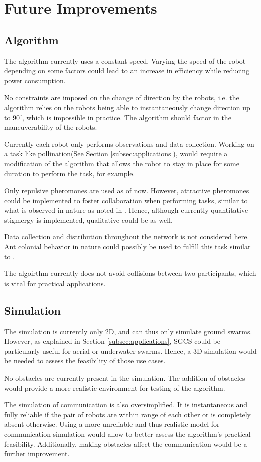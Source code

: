 \section{Future Improvements} 
\subsection{Algorithm}
The algorithm currently uses a constant speed. Varying the speed of the robot depending on some factors could lead to an increase in efficiency while reducing power consumption. 
\par No constraints are imposed on the change of direction by the robots, i.e. the algorithm relies on the robots being able to instantaneously change direction up to $90^{\circ}$, which is impossible in practice. The algorithm should factor in the maneuverability of the robots.
\par Currently each robot only performs observations and data-collection. Working on a task like pollination(See Section \ref{subsec:applications}), would require a modification of the algorithm that allows the robot to stay in place for some duration to perform the task, for example.
\par Only repulsive pheromones are used as of now. However, attractive pheromones could be implemented to foster collaboration when performing tasks, similar to what is observed in nature as noted in \parencite{david_morgan_trail_2009}. Hence, although currently quantitative stigmergy is implemented, qualitative could be as well.
\par Data collection and distribution throughout the network is not considered here. Ant colonial behavior in nature could possibly be used to fulfill this task similar to \parencite{adler_information_1992}.
\par The algoirthm currently does not avoid collisions between two participants, which is vital for practical applications.
\subsection{Simulation}
The simulation is currently only 2D, and can thus only simulate ground swarms. However, as explained in Section \ref{subsec:applications}, SGCS could be particularly useful for aerial or underwater swarms. Hence, a 3D simulation would be needed to assess the feasibility of those use cases.
\par No obstacles are currently present in the simulation. The addition of obstacles would provide a more realistic environment for testing of the algorithm.
\par The simulation of communication is also oversimplified. It is instantaneous and fully reliable if the pair of robots are within range of each other or is completely absent otherwise. Using a more unreliable and thus realistic model for communication simulation would allow to better assess the algorithm's practical feasibility. Additionally, making obstacles affect the communication would be a further improvement.
